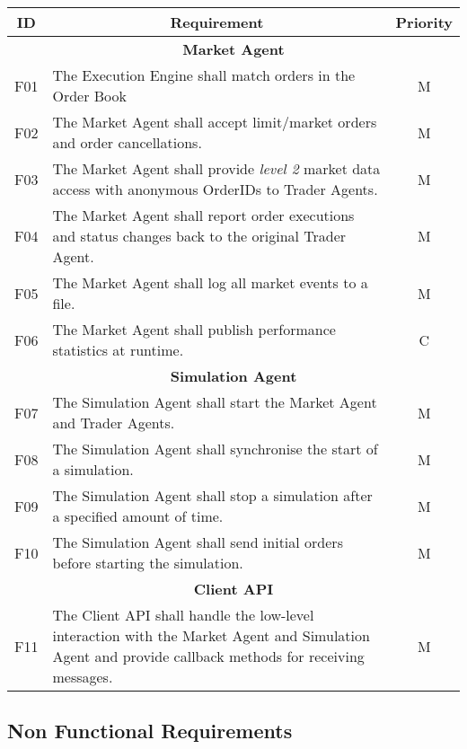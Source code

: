 \begin{center}
\begin{longtable}[htbp]{c p{4.2in} c }

\multicolumn{1}{c}{\textbf{ID}}           &
\multicolumn{1}{c}{\textbf{Requirement}}  &
\multicolumn{1}{c}{\textbf{Priority}}     \\              
\toprule

\multicolumn{3}{c}{\textbf{Market Agent}}   	         \\
F01  & The Execution Engine shall match orders in the Order Book & M \\ 
F02  & The Market Agent shall accept limit/market orders and order cancellations. & M \\
F03  & The Market Agent shall provide \textit{level 2} market data access with anonymous OrderIDs to Trader Agents. & M \\
F04  & The Market Agent shall report order executions and status changes back to the original Trader Agent. & M \\ 
F05  & The Market Agent shall log all market events to a file.        & M \\
F06  & The Market Agent shall publish performance statistics at runtime. & C \\

\multicolumn{3}{c}{\textbf{Simulation Agent}}   \\
F07  & The Simulation Agent shall start  the Market Agent and Trader Agents.  & M \\
F08  & The Simulation Agent shall synchronise the start of a simulation. & M \\
F09  & The Simulation Agent shall stop a simulation after a specified amount of time. & M \\
F10  & The Simulation Agent shall send initial orders before starting the simulation. & M \\ 

\multicolumn{3}{c}{\textbf{Client API}}   \\
F11  & The Client API shall handle the low-level interaction with the Market Agent and Simulation Agent and provide callback methods for receiving messages. & M \\
         
\end{longtable}
\end{center}

\subsection{Non Functional Requirements}

